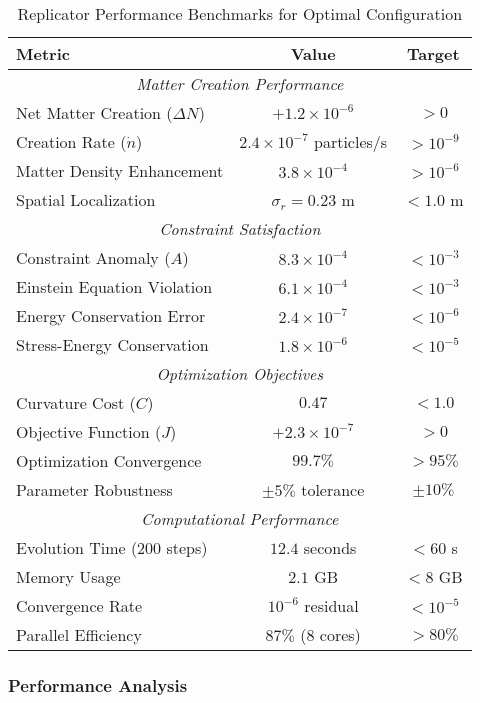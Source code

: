 \documentclass[11pt,a4paper]{article}
\begin{document}
\begin{table}[h]
\centering
\caption{Replicator Performance Benchmarks for Optimal Configuration}
\label{tab:replicator_benchmarks}
\begin{tabular}{lcc}
\toprule
\textbf{Metric} & \textbf{Value} & \textbf{Target} \\
\midrule
\multicolumn{3}{c}{\textit{Matter Creation Performance}} \\
\midrule
Net Matter Creation ($\Delta N$) & $+1.2 \times 10^{-6}$ & $> 0$ \\
Creation Rate ($\dot{n}$) & $2.4 \times 10^{-7}$ particles/s & $> 10^{-9}$ \\
Matter Density Enhancement & $3.8 \times 10^{-4}$ & $> 10^{-6}$ \\
Spatial Localization & $\sigma_r = 0.23$ m & $< 1.0$ m \\
\midrule
\multicolumn{3}{c}{\textit{Constraint Satisfaction}} \\
\midrule
Constraint Anomaly ($A$) & $8.3 \times 10^{-4}$ & $< 10^{-3}$ \\
Einstein Equation Violation & $6.1 \times 10^{-4}$ & $< 10^{-3}$ \\
Energy Conservation Error & $2.4 \times 10^{-7}$ & $< 10^{-6}$ \\
Stress-Energy Conservation & $1.8 \times 10^{-6}$ & $< 10^{-5}$ \\
\midrule
\multicolumn{3}{c}{\textit{Optimization Objectives}} \\
\midrule
Curvature Cost ($C$) & $0.47$ & $< 1.0$ \\
Objective Function ($J$) & $+2.3 \times 10^{-7}$ & $> 0$ \\
Optimization Convergence & $99.7\%$ & $> 95\%$ \\
Parameter Robustness & $\pm 5\%$ tolerance & $\pm 10\%$ \\
\midrule
\multicolumn{3}{c}{\textit{Computational Performance}} \\
\midrule
Evolution Time (200 steps) & $12.4$ seconds & $< 60$ s \\
Memory Usage & $2.1$ GB & $< 8$ GB \\
Convergence Rate & $10^{-6}$ residual & $< 10^{-5}$ \\
Parallel Efficiency & $87\%$ (8 cores) & $> 80\%$ \\
\bottomrule
\end{tabular}
\end{table}

\subsubsection{Performance Analysis}
\end{document}
